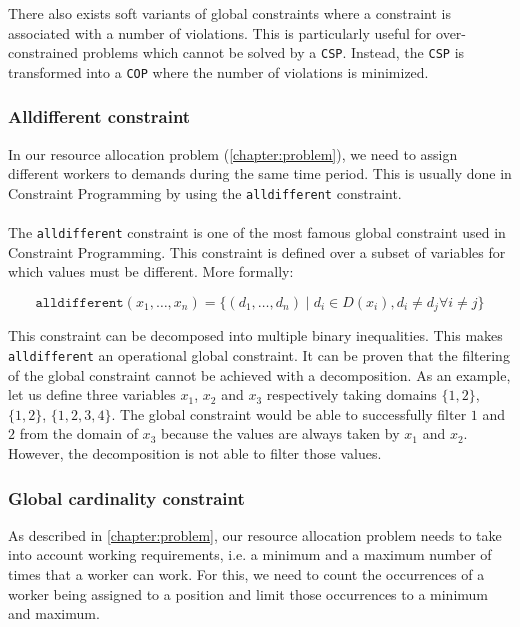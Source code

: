 \documentclass[../../thesis.tex]{subfiles}
\begin{document}
There also exists soft variants \cite{Regin:2000} of global constraints where a constraint is associated with 
a number of violations. This is particularly useful for over-constrained problems which cannot be solved by a \texttt{CSP}.
Instead, the \texttt{CSP} is transformed into a \texttt{COP} where the number of violations is minimized.

\subsubsection{Alldifferent constraint}
\label{sota:alldifferent}

In our resource allocation problem (\autoref{chapter:problem}), we need to assign different workers to demands during the same time period. 
This is usually done in Constraint Programming by using the \texttt{alldifferent} constraint.

\paragraph{}

The \texttt{alldifferent} constraint \cite{Rgin1994AFA} is one of the most famous global constraint used in Constraint 
Programming.
This constraint is defined over a subset of variables for which values must be different. More formally:

\begin{equation*}
  \texttt{alldifferent}(x_1, \dots, x_n) = \{ (d_1, \dots, d_n) \mid d_i \in D(x_i), d_i \neq d_j \forall i \neq j \}
\end{equation*}

This constraint can be decomposed into multiple binary inequalities. This makes \texttt{alldifferent} an operational global constraint.
It can be proven that the filtering of the global constraint cannot be achieved with a decomposition. As 
an example, let us define three variables $x_1$, $x_2$ and $x_3$ respectively taking domains $\{1,2\}$, $\{1,2\}$, $\{1,2,3,4\}$. 
The global constraint would be able to successfully filter $1$ and $2$ from the domain of 
$x_3$ because the values are always taken by $x_1$ and $x_2$. However, the decomposition is not able to filter those values.


\subsubsection{Global cardinality constraint}
\label{sota:gcc}

As described in \autoref{chapter:problem}, our resource allocation problem needs to take into account working requirements, i.e. a minimum 
and a maximum number of times that a worker can work. For this, we need to count the occurrences of a worker being assigned to a position and 
limit those occurrences to a minimum and maximum. 
\end{document}
